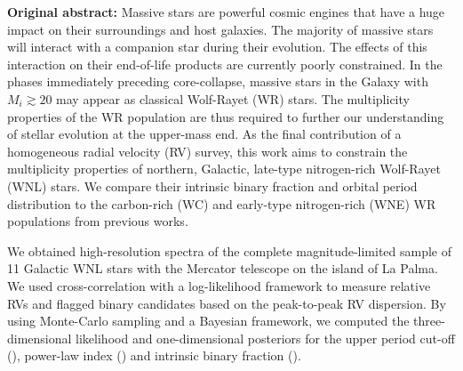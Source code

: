 \begin{abs}
\vspace{3mm}
\textbf{Original abstract:}
\newline \newline
Massive stars are powerful cosmic engines that have a huge impact on their surroundings and host galaxies. The majority of massive stars will interact with a companion star during their evolution. The effects of this interaction on their end-of-life products are currently poorly constrained. In the phases immediately preceding core-collapse, massive stars in the Galaxy with $M_i \gtrsim 20$ may appear as classical Wolf-Rayet (WR) stars. The multiplicity properties of the WR population are thus required to further our understanding of stellar evolution at the upper-mass end.
As the final contribution of a homogeneous radial velocity (RV) survey, this work aims to constrain the multiplicity properties of northern, Galactic, late-type nitrogen-rich Wolf-Rayet (WNL) stars. We compare their intrinsic binary fraction and orbital period distribution to the carbon-rich (WC) and early-type nitrogen-rich (WNE) WR populations from previous works.

We obtained high-resolution spectra of the complete magnitude-limited sample of 11 Galactic WNL stars with the Mercator telescope on the island of La Palma. We used cross-correlation with a log-likelihood framework to measure relative RVs and flagged binary candidates based on the peak-to-peak RV dispersion. By using Monte-Carlo sampling and a Bayesian framework, we computed the three-dimensional likelihood and one-dimensional posteriors for the upper period cut-off (\logPmaxWNL{}), power-law index (\piWNL{}) and intrinsic binary fraction (\fintWNL{}).


\end{abs}
